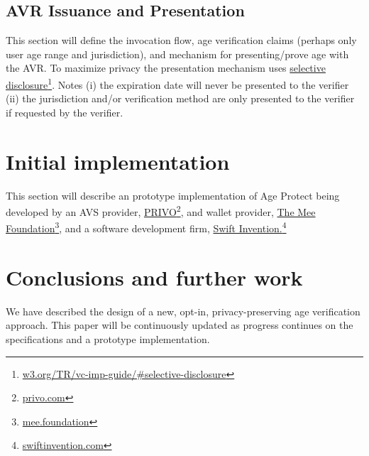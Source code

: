 \documentclass[11pt, oneside]{article}   	%
\newcommand{\hyperfootnote}[1][]{\def\ArgI{{#1}}\hyperfootnoteRelay}
\newcommand\hyperfootnoteRelay[2][]{\href{#1#2}{\ArgI}\footnote{\href{#1#2}{#2}}}
\begin{document}
\subsection{AVR Issuance and Presentation}
This section will define the invocation flow, age verification claims (perhaps only user age range and jurisdiction), and mechanism for presenting/prove age with the AVR. To maximize privacy the presentation mechanism uses \hyperfootnote[selective disclosure][https://]{w3.org/TR/vc-imp-guide/\#selective-disclosure}. Notes (i) the expiration date will never be presented to the verifier (ii) the jurisdiction and/or verification method are only presented to the verifier if requested by the verifier. 

\section{Initial implementation}

This section will describe an prototype implementation of Age Protect being developed by an AVS provider, \hyperfootnote[PRIVO][https://]{privo.com}, and wallet provider, \hyperfootnote[The Mee Foundation][https://]{mee.foundation}, and a software development firm, \hyperfootnote[Swift Invention.][https://]{swiftinvention.com}

\section{Conclusions and further work}
We have described the design of a new, opt-in, privacy-preserving age verification approach. This paper will be continuously updated as progress continues on the specifications and a prototype implementation.



\end{document}
